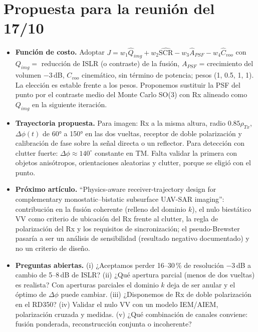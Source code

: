 \section{Propuesta para la reunión del 17/10}
\begin{itemize}[itemsep=2pt]
  \item \textbf{Función de costo.} Adoptar
  $J=w_1\hat Q_{img}+w_2\widehat{\mathrm{SCR}}-w_3\hat A_{PSF}-w_4\hat C_{voo}$ con
  $Q_{img}=$ reducción de ISLR (o contraste) de la fusión, $A_{PSF}$ = crecimiento del
  volumen $-3$\,dB, $C_{voo}$ cinemático, sin término de potencia; pesos (1, 0.5, 1, 1). La
  elección es estable frente a los pesos. Proponemos sustituir la PSF del punto por el
  contraste medio del Monte Carlo SO(3) con Rx alineado como $Q_{img}$ en la siguiente
  iteración.
  \item \textbf{Trayectoria propuesta.} Para imagen: Rx a la misma altura, radio
  $0.85\rho_{Tx}$, $\Delta\phi(t)$ de 60° a 150° en las dos vueltas, receptor de doble
  polarización y calibración de fase sobre la señal directa o un reflector. Para detección con
  clutter fuerte: $\Delta\phi\approx140^{\circ}$ constante en TM. Falta validar la primera con
  objetos anisótropos, orientaciones aleatorias y clutter, porque se eligió con el punto.
  \item \textbf{Próximo artículo.} ``Physics-aware receiver-trajectory design for complementary
  monostatic--bistatic subsurface UAV-SAR imaging'': contribución en la fusión coherente
  (relleno del dominio $k$), el nulo biestático VV como criterio de ubicación del Rx frente al
  clutter, la regla de polarización del Rx y los requisitos de sincronización; el pseudo-Brewster pasaría a ser un análisis de sensibilidad
  (resultado negativo documentado) y no un criterio de diseño.
  \item \textbf{Preguntas abiertas.} (i) ¿Aceptamos perder 16--30\,\% de resolución $-3$\,dB a
  cambio de 5--8\,dB de ISLR? (ii) ¿Qué apertura parcial (menos de dos vueltas) es realista?
  Con aperturas parciales el dominio $k$ deja de ser anular y el óptimo de $\Delta\phi$ puede
  cambiar. (iii) ¿Disponemos de Rx de doble polarización en el RD350? (iv) Validar el nulo
  VV con un modelo IEM/AIEM, polarización cruzada y medidas. (v) ¿Qué combinación de canales
  conviene: fusión ponderada, reconstrucción conjunta o incoherente?
\end{itemize}
